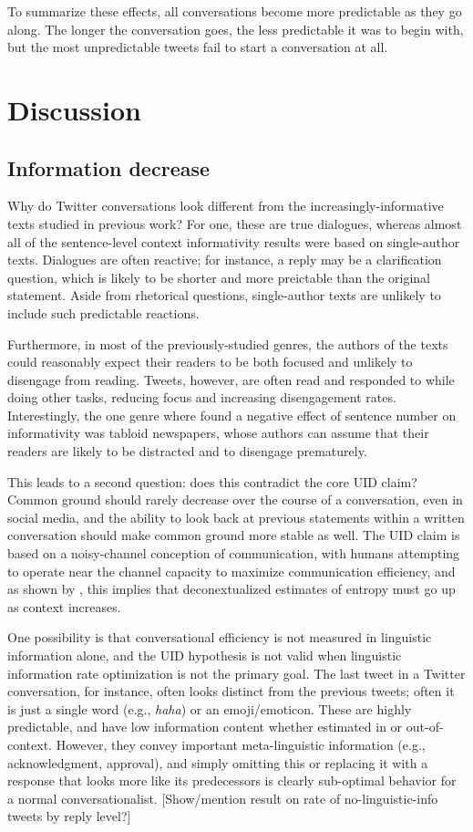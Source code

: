 \documentclass[11pt,letterpaper]{article}
\begin{document}
To summarize these effects, all conversations become more predictable as they go along. The longer the conversation goes, the less predictable it was to begin with, but the most unpredictable tweets fail to start a conversation at all.

\section{Discussion}

\subsection{Information decrease}
Why do Twitter conversations look different from the increasingly-informative texts studied in previous work? For one, these are true dialogues, whereas almost all of the sentence-level context informativity results were based on single-author texts.  Dialogues are often reactive; for instance, a reply may be a clarification question, which is likely to be shorter and more preictable than the original statement. Aside from rhetorical questions, single-author texts are unlikely to include such predictable reactions.

Furthermore, in most of the previously-studied genres, the authors of the texts could reasonably expect their readers to be both focused and unlikely to disengage from reading. Tweets, however, are often read and responded to while doing other tasks, reducing focus and increasing disengagement rates.  Interestingly, the one genre where  found a negative effect of sentence number on informativity was tabloid newspapers, whose authors can assume that their readers are likely to be distracted and to disengage prematurely.

This leads to a second question: does this contradict the core UID claim?  Common ground should rarely decrease over the course of a conversation, even in social media, and the ability to look back at previous statements within a written conversation should make common ground more stable as well.  The UID claim is based on a noisy-channel conception of communication, with humans attempting to operate near the channel capacity to maximize communication efficiency, and as shown by , this implies that deconextualized estimates of entropy must go up as context increases.

One possibility is that conversational efficiency is not measured in linguistic information alone, and the UID hypothesis is not valid when linguistic information rate optimization is not the primary goal.  The last tweet in a Twitter conversation, for instance, often looks distinct from the previous tweets; often it is just a single word (e.g., {\it haha}) or an emoji/emoticon.  These are highly predictable, and have low information content whether estimated in or out-of-context.  However, they convey important meta-linguistic information (e.g., acknowledgment, approval), and simply omitting this or replacing it with a response that looks more like its predecessors is clearly sub-optimal behavior for a normal conversationalist.  [Show/mention result on rate of no-linguistic-info tweets by reply level?]
\end{document}
